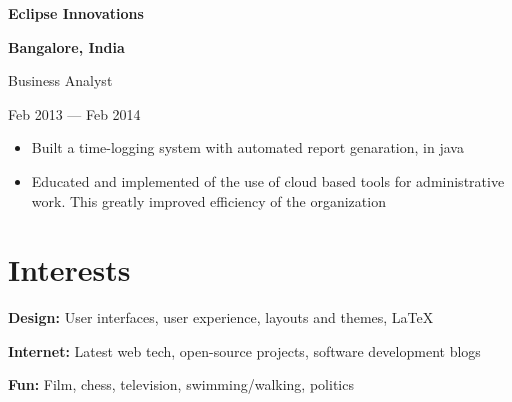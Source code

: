 \documentclass[11pt, letterpaper]{article}
\def\trim#1{\ignorespaces#1\unskip}
\newcommand{\itemtitle}[2]
{ %
  \begin{minipage}[b]{0.7\hsize}
    \begin{flushleft}
      \bfseries
      \trim{#1}
    \end{flushleft}
  \end{minipage}
  \hfill
  \begin{minipage}[b]{0.3\hsize}
    \begin{flushright}
      \bfseries
      \trim{#2}
    \end{flushright}
  \end{minipage}
  \vspace{0.3em}
}
\newcommand{\itemdetail}[2]
{ %
  \begin{minipage}[b]{0.7\hsize}
    \begin{flushleft}
      \trim{#1}
    \end{flushleft}
  \end{minipage}
  \hfill
  \begin{minipage}[b]{0.3\hsize}
    \begin{flushright}
      \trim{#2}
    \end{flushright}
  \end{minipage}
  \vspace{-1em}
}
\begin{document}
\itemtitle{ Eclipse Innovations }{ Bangalore, India }
\itemdetail{ Business Analyst }{ Feb 2013 --- Feb 2014 }
\begin{itemize}
  \item Built a time-logging system with automated report genaration, in java
  \item Educated and implemented of the use of cloud based tools for administrative work. This greatly improved efficiency of the organization
\end{itemize}


\section*{Interests}

\textbf{\trim{ Design: }} User interfaces, user experience, layouts and themes, \LaTeX\

\textbf{\trim{ Internet: }} Latest web tech, open-source projects, software development blogs

\textbf{\trim{ Fun: }} Film, chess, television, swimming/walking, politics
\end{document}
